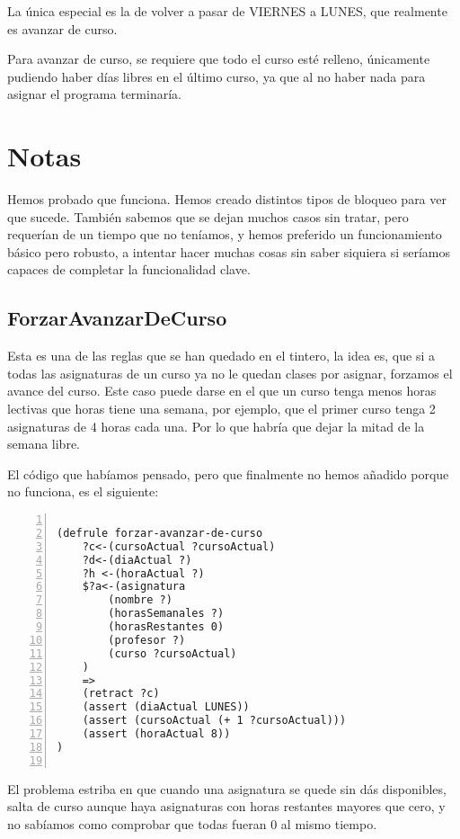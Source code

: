 \documentclass{report}
\begin{document}
La \'{u}nica especial es la de volver a pasar de VIERNES a LUNES, que realmente es avanzar de curso.

Para avanzar de curso, se requiere que todo el curso est\'{e} relleno, \'{u}nicamente pudiendo haber
d\'{i}as libres en el \'{u}ltimo curso, ya que al no haber nada para asignar el programa terminar\'{i}a.

\appendix
\chapter{Notas}
Hemos probado que funciona. Hemos creado distintos tipos de bloqueo para ver que sucede. Tambi\'{e}n sabemos que se dejan
muchos casos sin tratar, pero requer\'{i}an de un tiempo que no ten\'{i}amos, y hemos preferido un funcionamiento b\'{a}sico
pero robusto, a intentar hacer muchas cosas sin saber siquiera si ser\'{i}amos capaces de completar la funcionalidad clave.

\section{ForzarAvanzarDeCurso}
Esta es una de las reglas que se han quedado en el tintero, la idea es, que si a todas las asignaturas de un curso ya no le quedan clases
por asignar, forzamos el avance del curso. Este caso puede darse en el que un curso tenga menos horas lectivas que horas tiene una semana, 
por ejemplo, que el primer curso tenga 2 asignaturas de 4 horas cada una. Por lo que habr\'{i}a que dejar la mitad de la semana libre.

El c\'{o}digo que hab\'{i}amos pensado, pero que finalmente no hemos a\~{n}adido porque no funciona, es el siguiente:
\begin{lstlisting}[language=LISP, showspaces=false, numbers=left, breaklines=true]

(defrule forzar-avanzar-de-curso
    ?c<-(cursoActual ?cursoActual)
    ?d<-(diaActual ?)
    ?h <-(horaActual ?)
    $?a<-(asignatura 
        (nombre ?) 
        (horasSemanales ?) 
        (horasRestantes 0) 
        (profesor ?) 
        (curso ?cursoActual)
    )
    =>
    (retract ?c)
    (assert (diaActual LUNES))
    (assert (cursoActual (+ 1 ?cursoActual)))
    (assert (horaActual 8))
)
    
\end{lstlisting}

El problema estriba en que cuando una asignatura se quede sin d\'{a}s disponibles, salta de curso aunque haya asignaturas con horas restantes
mayores que cero, y no sab\'{i}amos como comprobar que todas fueran 0 al mismo tiempo.
\end{document}
